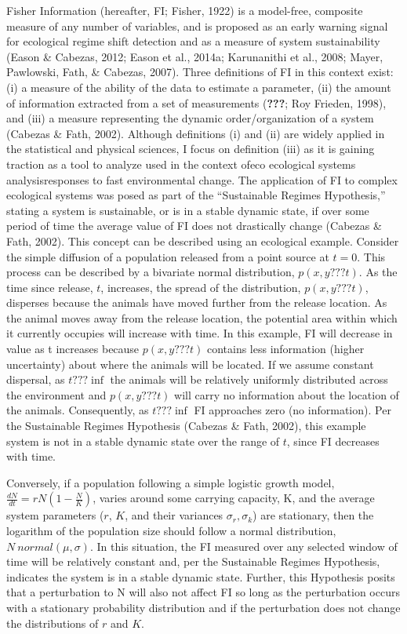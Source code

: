 \documentclass[12pt,twoside,openany]{reedthesis}
\begin{document}
Fisher Information (hereafter, FI; Fisher, 1922) is a model-free, composite measure of any number of variables, and is proposed as an early warning signal for ecological regime shift detection and as a measure of system sustainability (Eason \& Cabezas, 2012; Eason et al., 2014a; Karunanithi et al., 2008; Mayer, Pawlowski, Fath, \& Cabezas, 2007). Three definitions of FI in this context exist: (i) a measure of the ability of the data to estimate a parameter, (ii) the amount of information extracted from a set of measurements ({\textbf{???}}; Roy Frieden, 1998), and (iii) a measure representing the dynamic order/organization of a system (Cabezas \& Fath, 2002). Although definitions (i) and (ii) are widely applied in the statistical and physical sciences, I focus on definition (iii) as it is gaining traction as a tool to analyze used in the context ofeco ecological systems analysisresponses to fast environmental change. The application of FI to complex ecological systems was posed as part of the ``Sustainable Regimes Hypothesis,'' stating a system is sustainable, or is in a stable dynamic state, if over some period of time the average value of FI does not drastically change (Cabezas \& Fath, 2002). This concept can be described using an ecological example. Consider the simple diffusion of a population released from a point source at \(t=0\). This process can be described by a bivariate normal distribution, \(p(x,y???t)\). As the time since release, \(t\), increases, the spread of the distribution, \(p(x,y???t)\), disperses because the animals have moved further from the release location. As the animal moves away from the release location, the potential area within which it currently occupies will increase with time. In this example, FI will decrease in value as t increases because \(p(x,y???t)\) contains less information (higher uncertainty) about where the animals will be located. If we assume constant dispersal, as \(t???\inf\) the animals will be relatively uniformly distributed across the environment and \(p(x,y???t)\) will carry no information about the location of the animals. Consequently, as \(t???\inf\) FI approaches zero (no information). Per the Sustainable Regimes Hypothesis (Cabezas \& Fath, 2002), this example system is not in a stable dynamic state over the range of \(t\), since FI decreases with time.

Conversely, if a population following a simple logistic growth model, \(\frac{dN}{dt}=rN(1-\frac{N}{K})\), varies around some carrying capacity, K, and the average system parameters (\(r\), \(K\), and their variances \(\sigma_r, \sigma_k\)) are stationary, then the logarithm of the population size should follow a normal distribution, \(N ~ normal(\mu,\sigma)\). In this situation, the FI measured over any selected window of time will be relatively constant and, per the Sustainable Regimes Hypothesis, indicates the system is in a stable dynamic state. Further, this Hypothesis posits that a perturbation to N will also not affect FI so long as the perturbation occurs with a stationary probability distribution and if the perturbation does not change the distributions of \(r\) and \(K\).
\end{document}
